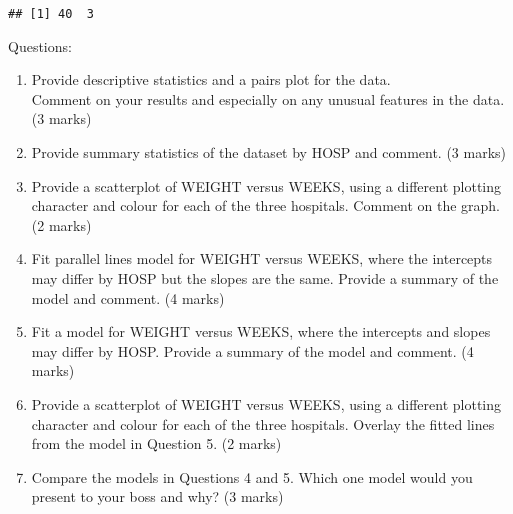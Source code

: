 \documentclass[11pt,]{article}
\newenvironment{Shaded}{\begin{snugshade}}{\end{snugshade}}
\newcommand{\KeywordTok}[1]{\textcolor[rgb]{0.13,0.29,0.53}{\textbf{#1}}}
\newcommand{\DataTypeTok}[1]{\textcolor[rgb]{0.13,0.29,0.53}{#1}}
\newcommand{\DecValTok}[1]{\textcolor[rgb]{0.00,0.00,0.81}{#1}}
\newcommand{\StringTok}[1]{\textcolor[rgb]{0.31,0.60,0.02}{#1}}
\newcommand{\CommentTok}[1]{\textcolor[rgb]{0.56,0.35,0.01}{\textit{#1}}}
\newcommand{\OperatorTok}[1]{\textcolor[rgb]{0.81,0.36,0.00}{\textbf{#1}}}
\newcommand{\NormalTok}[1]{#1}
\begin{document}
\begin{Shaded}
\end{Shaded}

\begin{verbatim}
## [1] 40  3
\end{verbatim}

\begin{Shaded}
\end{Shaded}

Questions:

\begin{enumerate}
\def\labelenumi{\arabic{enumi}.}
\item
  Provide descriptive statistics and a pairs plot for the data.\\
  Comment on your results and especially on any unusual features in the
  data. (3 marks)
\item
  Provide summary statistics of the dataset by HOSP and comment. (3
  marks)
\item
  Provide a scatterplot of WEIGHT versus WEEKS, using a different
  plotting character and colour for each of the three hospitals. Comment
  on the graph. (2 marks)
\item
  Fit parallel lines model for WEIGHT versus WEEKS, where the intercepts
  may differ by HOSP but the slopes are the same. Provide a summary of
  the model and comment. (4 marks)
\item
  Fit a model for WEIGHT versus WEEKS, where the intercepts and slopes
  may differ by HOSP. Provide a summary of the model and comment. (4
  marks)
\item
  Provide a scatterplot of WEIGHT versus WEEKS, using a different
  plotting character and colour for each of the three hospitals. Overlay
  the fitted lines from the model in Question 5. (2 marks)
\item
  Compare the models in Questions 4 and 5. Which one model would you
  present to your boss and why? (3 marks)
\end{enumerate}
\end{document}
